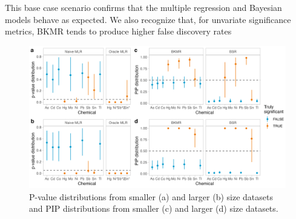 \documentclass[12pt, twoside]{amherstthesis}
\begin{document}
This base case scenario confirms that the multiple regression and Bayesian models behave as expected. We also recognize that, for unvariate significance metrics, BKMR tends to produce higher false discovery rates
\begin{figure}

{\centering \includegraphics[width=1\linewidth]{figures/ch4_basecasesig} 

}

\caption{P-value distributions from smaller (a) and larger (b) size datasets and PIP distributions from smaller (c) and larger (d) size datasets.}\label{fig:basecasesig}
\end{figure}
\end{document}

